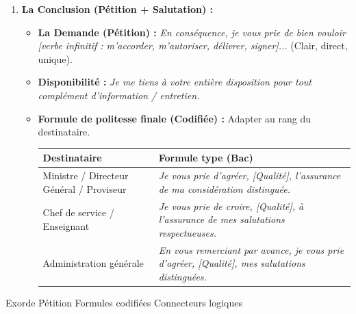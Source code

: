 \documentclass[11pt]{article}
\newcommand{\cle}[1]{{\popxbold\color{popdark}#1}}
\begin{document}
\begin{methode}
\begin{enumerate}
\begin{itemize}
        \item \textbf{Preuves :} \emph{Comme en attestent les pièces jointes n°1 et 2...}
    \end{itemize}
    \item \textbf{La Conclusion (Pétition + Salutation) :}
    \begin{itemize}
        \item \textbf{La Demande (Pétition) :} \emph{En conséquence, je vous prie de bien vouloir [verbe infinitif : m'accorder, m'autoriser, délivrer, signer]...} (Clair, direct, unique).
        \item \textbf{Disponibilité :} \emph{Je me tiens à votre entière disposition pour tout complément d'information / entretien.}
        \item \textbf{Formule de politesse finale (Codifiée) :} Adapter au rang du destinataire.
        \begin{center}
            \begin{tabular}{|l|l|}
            \hline
            \textbf{Destinataire} & \textbf{Formule type (Bac)} \\
            \hline
            Ministre / Directeur Général / Proviseur & \emph{Je vous prie d'agréer, [Qualité], l'assurance de ma considération distinguée.} \\
            Chef de service / Enseignant & \emph{Je vous prie de croire, [Qualité], à l'assurance de mes salutations respectueuses.} \\
            Administration générale & \emph{En vous remerciant par avance, je vous prie d'agréer, [Qualité], mes salutations distinguées.} \\
            \hline
            \end{tabular}
        \end{center}
    \end{itemize}
\end{enumerate}
\cle{Exorde} \cle{Pétition} \cle{Formules codifiées} \cle{Connecteurs logiques}
\end{methode}
\end{document}
